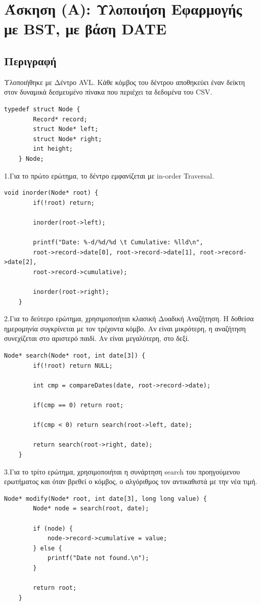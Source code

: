 \documentclass[a4paper,12pt]{article}
\begin{document}
\section{Άσκηση (Α): Υλοποιήση Εφαρμογής με BST, με βάση DATE}
\subsection{Περιγραφή}
Υλοποιήθηκε με Δέντρο AVL. Κάθε κόμβος του δέντρου αποθηκεύει έναν δείκτη στον δυναμικά δεσμευμένο πίνακα που περιέχει τα δεδομένα του CSV.\\
\begin{lstlisting}[caption={Δομή κόμβου}]
	typedef struct Node {
		Record* record;
		struct Node* left;
		struct Node* right;
		int height;
	} Node;
\end{lstlisting}
1.Για το πρώτο ερώτημα, το δέντρο εμφανίζεται με in-order Traversal.\\
\begin{lstlisting}[caption={Συνάρτηση inorder}]
	void inorder(Node* root) {
		if(!root) return;
		
		inorder(root->left);
		
		printf("Date: %-d/%d/%d \t Cumulative: %lld\n", 
		root->record->date[0], root->record->date[1], root->record->date[2],
		root->record->cumulative);
		
		inorder(root->right);
	}
\end{lstlisting}
2.Για το δεύτερο ερώτημα, χρησιμοποιήται κλασική Δυαδική Αναζήτηση. Η δοθείσα ημερομηνία συγκρίνεται με τον τρέχοντα κόμβο. Αν είναι μικρότερη, η αναζήτηση συνεχίζεται στο αριστερό παιδί. Αν είναι μεγαλύτερη, στο δεξί.\\
\begin{lstlisting}[caption={Συνάρτηση search}]
	Node* search(Node* root, int date[3]) {
		if(!root) return NULL;
		
		int cmp = compareDates(date, root->record->date);
		
		if(cmp == 0) return root;
		
		if(cmp < 0) return search(root->left, date);
		
		return search(root->right, date);
	}
\end{lstlisting}
3.Για το τρίτο ερώτημα, χρησιμοποιήται η συνάρτηση search του προηγούμενου ερωτήματος και όταν βρεθεί ο κόμβος, ο αλγόριθμος τον αντικαθιστά με την νέα τιμή.\\
\begin{lstlisting}[caption={Συνάρτηση modify}]
	Node* modify(Node* root, int date[3], long long value) {
		Node* node = search(root, date);
		
		if (node) {
			node->record->cumulative = value;
		} else {
			printf("Date not found.\n");
		}
		
		return root;
	}
\end{lstlisting}
\end{document}
